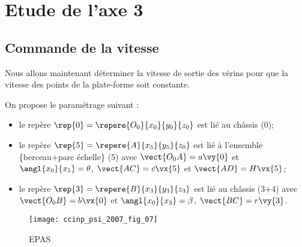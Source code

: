 \section{Etude de l'axe 3}
\subsection{Commande de la vitesse}

Nous allons maintenant déterminer la vitesse de sortie des vérins pour que la vitesse des points de la
 plate-forme soit constante.
 
 On propose le paramétrage suivant :
 \begin{itemize}
 \item le repère $\rep{0}=\repere{O_0}{x_0}{y_0}{z_0}$ est lié au châssis (0);
 \item le repère $\rep{5}=\repere{A}{x_5}{y_5}{z_0}$ est lié à l’ensemble \{berceau+parc échelle\} (5) 
 avec $\vect{O_0 A} = a\vy{0}$ et $\angl{x_0}{x_5} = \theta$, $\vect{AC}=c\vx{5}$ et $\vect{AD}= H\vx{5}$;
 \item le repère $\rep{3}=\repere{B}{x_3}{y_3}{z_3}$ est lié au châssis (3+4) 
  avec $\vect{O_0 B} = b\vx{0}$ et $\angl{x_0}{x_3} = \beta$, $\vect{BC}=r\vy{3}$.
  \end{itemize}

\begin{figure}[H]
\centering
\texttt{[image: ccinp\_psi\_2007\_fig\_07]}
\caption{\label{ccinp_psi_2007_fig_07} EPAS}
\end{figure}

 \ifprof
 \begin{corrige}
 \end{corrige}
 \else
 \fi

\ifprof
\begin{corrige}
\end{corrige}
\else
\fi

\ifprof
\begin{corrige}
\end{corrige}
\else
\fi

